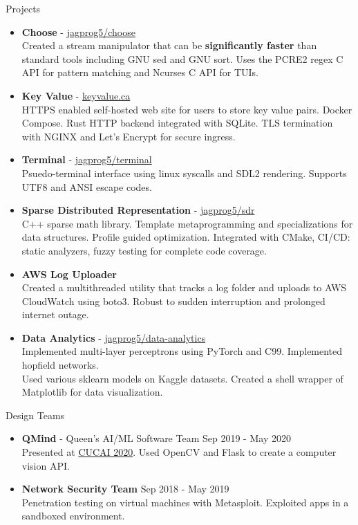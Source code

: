 \documentclass{resume} %
\begin{document}
\begin{rSection}{Projects}
    \begin{itemize}
        \item {\bf Choose} - \href{https://github.com/jagprog5/choose/}{jagprog5/choose}\\
        Created a stream manipulator that can be \textbf{significantly faster} than standard tools including GNU sed and GNU sort.
        Uses the PCRE2 regex C API for pattern matching and Ncurses C API for TUIs.
        \item {\bf Key Value} - \href{http://www.keyvalue.ca/}{keyvalue.ca}\\
        HTTPS enabled self-hosted web site for users to store key value pairs. Docker Compose. Rust HTTP backend integrated with SQLite. TLS termination with NGINX and Let's Encrypt for secure ingress.
        \item {\bf Terminal} - \href{https://github.com/jagprog5/terminal}{jagprog5/terminal}\\
        Psuedo-terminal interface using linux syscalls and SDL2 rendering. Supports UTF8 and ANSI escape codes.
        \item {\bf Sparse Distributed Representation} - \href{https://github.com/jagprog5/SDR/}{jagprog5/sdr}\\
        C++ sparse math library. Template metaprogramming and specializations for data structures. Profile guided optimization. Integrated with CMake, CI/CD: static analyzers, fuzzy testing for complete code coverage.
        \item {\bf AWS Log Uploader}\\
        Created a multithreaded utility that tracks a log folder and uploads to AWS CloudWatch using boto3. Robust to sudden interruption and prolonged internet outage.
        \item {\bf Data Analytics} - \href{https://github.com/jagprog5/resume/blob/main/data-analytics-projects.md}{jagprog5/data-analytics}\\
        Implemented multi-layer perceptrons using PyTorch and C99. Implemented hopfield networks.\\
        Used various sklearn models on Kaggle datasets. Created a shell wrapper of Matplotlib for data visualization. 
    \end{itemize}
\end{rSection}

\begin{rSection}{Design Teams}
    \begin{itemize}
        \item {\bf QMind} - Queen's AI/ML Software Team \hfill {Sep 2019 - May 2020}\\
        Presented at \href{https://medium.com/@cameronmackinn/cucai-2020-c821c15f3ab4}{CUCAI 2020}. Used OpenCV and Flask to create a computer vision API.
        \item {\bf Network Security Team} \hfill {Sep 2018 - May 2019}\\
        Penetration testing on virtual machines with Metasploit. Exploited apps in a sandboxed environment.
\end{itemize}
\end{rSection}
\end{document}
